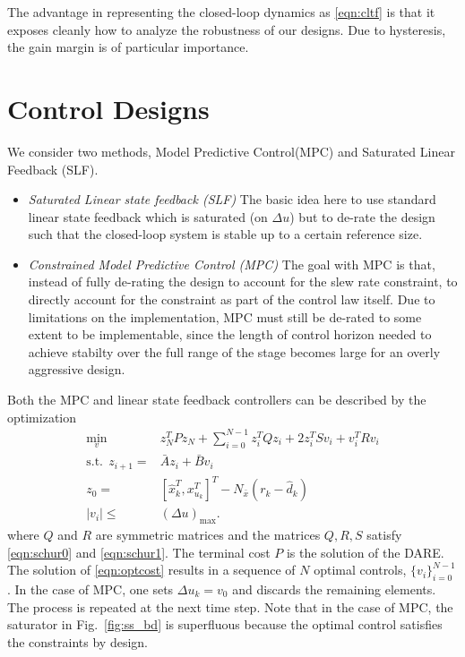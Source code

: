 \documentclass[twocolumn,twoside]{IEEEtran}
\newcommand{\Ad}{\ensuremath{\bar A }\xspace}
\newcommand{\Bd}{\ensuremath{\bar B }\xspace}
\begin{document}
The advantage in representing the closed-loop dynamics as \eqref{eqn:cltf} is that it exposes cleanly how to analyze the robustness of our designs. Due to hysteresis, the gain margin is of particular importance. 


%   


\section{Control Designs}\label{sec:tune}
We consider two methods, Model Predictive Control(MPC) and Saturated Linear Feedback (SLF).
\begin{itemize}
\item\emph{Saturated Linear state feedback (SLF)} The basic idea here to use standard linear state feedback which is saturated (on $\Delta u$) but to de-rate the design such that the closed-loop system is stable up to a certain reference size. 
\item\emph{Constrained Model Predictive Control (MPC)} The goal with MPC is that, instead of fully de-rating the design to account for the slew rate constraint, to directly account for the constraint as part of the control law itself. Due to limitations on the implementation, MPC must still be de-rated to some extent to be implementable, since the length of control horizon needed to achieve stabilty over the full range of the stage becomes large for an overly aggressive design.
\end{itemize}

Both the MPC and linear state feedback controllers can be described by the optimization
\begin{align}
\min_{v}\:\:& z^T_{N}Pz_{N} + \sum_{i=0}^{N-1}z_{i}^{T}Qz_{i} + 2z^T_iSv_i + v^{T}_{i}Rv_{i} \label{eqn:optcost}\\
  \text{s.t.}\:\:  z_{i+1} =& \Ad z_{i} + \Bd v_{i}\\
z_{0} =& [\hat{x}^T_{k}, x^T_{u_k}]^T - N_{\bar{x}}(r_k-\hat{d}_k)\\
|v_i | \leq& (\Delta u)_{\text{max}}.\label{eqn:cntrl_constraint}
\end{align}
where $Q$ and $R$ are symmetric matrices and the matrices $Q,R,S$ satisfy \eqref{eqn:schur0} and \eqref{eqn:schur1}.
The terminal cost $P$ is the solution of the DARE. The solution of \eqref{eqn:optcost} results in a sequence of $N$ optimal controls, $\{v_i\}_{i=0}^{N-1}$. In the case of MPC, one sets $\Delta u_k = v_0$ and discards the remaining elements. The process is repeated at the next time step. Note that in the case of MPC, the saturator in Fig.~\ref{fig:ss_bd} is superfluous because the optimal control satisfies the constraints by design.
\end{document}
